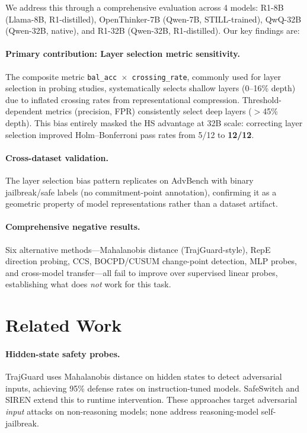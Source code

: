 \documentclass[11pt]{article}
\begin{document}
We address this through a comprehensive evaluation across 4 models: R1-8B (Llama-8B, R1-distilled), OpenThinker-7B (Qwen-7B, STILL-trained), QwQ-32B (Qwen-32B, native), and R1-32B (Qwen-32B, R1-distilled).
Our key findings are:

\paragraph{Primary contribution: Layer selection metric sensitivity.}
The composite metric \texttt{bal\_acc $\times$ crossing\_rate}, commonly used for layer selection in probing studies, systematically selects shallow layers (0--16\% depth) due to inflated crossing rates from representational compression.
Threshold-dependent metrics (precision, FPR) consistently select deep layers ($>$45\% depth).
This bias entirely masked the HS advantage at 32B scale: correcting layer selection improved Holm--Bonferroni pass rates from 5/12 to \textbf{12/12}.

\paragraph{Cross-dataset validation.}
The layer selection bias pattern replicates on AdvBench \cite{zou2023advbench} with binary jailbreak/safe labels (no commitment-point annotation), confirming it as a geometric property of model representations rather than a dataset artifact.

\paragraph{Comprehensive negative results.}
Six alternative methods---Mahalanobis distance (TrajGuard-style), RepE direction probing, CCS, BOCPD/CUSUM change-point detection, MLP probes, and cross-model transfer---all fail to improve over supervised linear probes, establishing what does \emph{not} work for this task.


\section{Related Work}

\paragraph{Hidden-state safety probes.}
TrajGuard \cite{li2024trajguard} uses Mahalanobis distance on hidden states to detect adversarial inputs, achieving 95\% defense rates on instruction-tuned models.
SafeSwitch \cite{chen2025safeswitch} and SIREN \cite{wang2025siren} extend this to runtime intervention.
These approaches target adversarial \emph{input} attacks on non-reasoning models; none address reasoning-model self-jailbreak.
\end{document}

